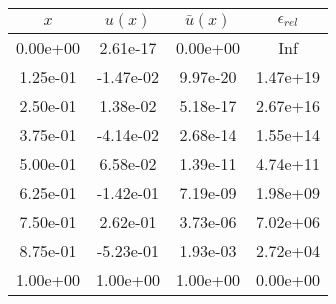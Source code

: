\begin{tabular}{|c|c|c|c|}
\hline
\textbf{$x$}&\textbf{$u(x)$}&\textbf{$\bar{u}(x)$}&\textbf{$\epsilon_{rel}$}\\\hline
0.00e+00&2.61e-17&0.00e+00&Inf\\\hline
1.25e-01&-1.47e-02&9.97e-20&1.47e+19\\\hline
2.50e-01&1.38e-02&5.18e-17&2.67e+16\\\hline
3.75e-01&-4.14e-02&2.68e-14&1.55e+14\\\hline
5.00e-01&6.58e-02&1.39e-11&4.74e+11\\\hline
6.25e-01&-1.42e-01&7.19e-09&1.98e+09\\\hline
7.50e-01&2.62e-01&3.73e-06&7.02e+06\\\hline
8.75e-01&-5.23e-01&1.93e-03&2.72e+04\\\hline
1.00e+00&1.00e+00&1.00e+00&0.00e+00\\\hline
\end{tabular}
